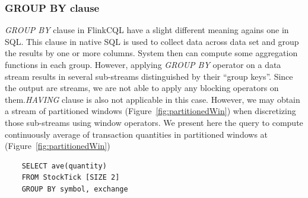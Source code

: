\subsubsection*{GROUP BY clause}
\textit{GROUP BY} clause in FlinkCQL have a slight different meaning agains one in SQL. This clause in native SQL is used to collect data across data set and group the results by one or more columns. System then can compute some aggregation functions in each group. However, applying \textit{GROUP BY} operator on a data stream results in several sub-streams distinguished by their ``group keys''. Since the output are streams, we are not able to apply any blocking operators on them.\textit{HAVING} clause is also not applicable in this case. However,  we may obtain a stream of partitioned windows (Figure~\ref{fig:partitionedWin}) when discretizing those sub-streams using window operators. We present here the query to compute continuously average of transaction quantities in partitioned windows at  (Figure~\ref{fig:partitionedWin})
\begin{lstlisting}
	SELECT ave(quantity)
	FROM StockTick [SIZE 2]
	GROUP BY symbol, exchange
\end{lstlisting}


